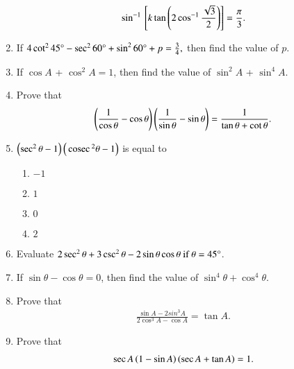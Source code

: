 \begin{enumerate}[label=\thesubsection.\arabic*,ref=\thesubsection.\theenumi,itemsep=1pt]
	\begin {align*}
	\sin^{-1} {}\left[k \tan \left( 2\cos^{-1} \frac {\sqrt{3}}{2}\right)\right]= \frac{\pi}{3}.
\end {align*}
\hfill{}
\item If $4 \cot^{2}45\degree-\sec^{2}60\degree+\sin^{2}60\degree+p=\frac{3}{4},$ then find the value of $p$.
\hfill{}\item If $\cos A$ + $\cos^{2}A = 1$, then find the value of $\sin^{2}A$ + $\sin^{4}A$.
\hfill{}
\item Prove that 
\begin{align*}
	\left(\frac{1}{\cos\theta}-\cos\theta\right) \left(\frac{1}{\sin\theta}-\sin\theta\right) = \frac{1}{\tan\theta + \cot\theta}
.\end{align*}
\hfill{}
\item $ \left(\sec^2 \theta - 1\right)\left(\,\text{cosec}\,^2 \theta - 1\right)$
is equal to
\begin{multicols}{4}
\begin{enumerate}
\item $-1$
\item $1$
\item $0$
\item $2$
\end{enumerate}
\end{multicols}
\hfill{}\item
Evaluate 
$2\sec^2\theta + 3\csc^2\theta - 2\sin\theta\cos\theta  \ \text{if} \ \theta = 45\degree
$.
\hfill{}\item 
If 
$\sin\theta - \cos\theta = 0$,  then find the value of $\sin^4\theta + \cos^4\theta$.
\hfill{}\item
Prove that \begin{align*} \frac{\sin{A}-2sin^3{A}}{2\cos^3{A}-\cos{A}}=\tan{A} .\end{align*}
\hfill{}\item
Prove that \begin{align*} \sec{A\ensuremath{\left(1-\sin{A}\right)}\ensuremath{\left(\sec{A}+\tan{A}\right)}}=1. \end{align*}
\hfill{}
\end{enumerate}
